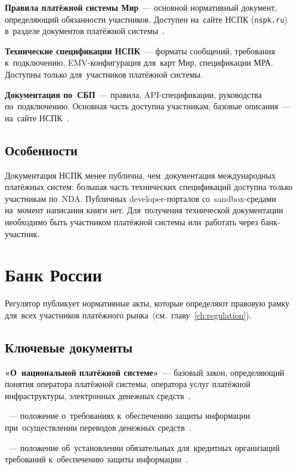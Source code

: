 \textbf{Правила платёжной системы Мир}~--- основной
нормативный документ, определяющий обязанности участников.
Доступен на~сайте НСПК (\texttt{nspk.ru}) в~разделе
документов платёжной системы~.

\textbf{Технические спецификации НСПК}~--- форматы сообщений,
требования к~подключению, EMV-конфигурация для~карт Мир,
спецификации МРА. Доступны только для~участников
платёжной системы.

\textbf{Документация по~СБП}~--- правила, API-спецификации,
руководства по~подключению. Основная часть доступна
участникам; базовые описания~--- на~сайте
НСПК~.

\subsection*{Особенности}

Документация НСПК менее публична, чем~документация
международных платёжных систем: большая часть технических
спецификаций доступна только участникам по~NDA.
Публичных developer-порталов со~sandbox-средами
на~момент написания книги нет. Для~получения технической
документации необходимо быть участником платёжной системы
или~работать через банк-участник.


\section{Банк России}
\label{sec:ps-cbr}

Регулятор публикует нормативные акты, которые определяют
правовую рамку для~всех участников платёжного
рынка~(см.~главу~\ref{ch:regulation}).

\subsection*{Ключевые документы}

\textbf{ «О~национальной платёжной системе»}~---
базовый закон, определяющий понятия оператора платёжной
системы, оператора услуг платёжной инфраструктуры,
электронных денежных средств~.

\textbf{}~--- положение о~требованиях к~обеспечению
защиты информации при~осуществлении переводов денежных
средств~.

\textbf{}~--- положение об~установлении обязательных
для~кредитных организаций требований к~обеспечению защиты
информации~.

